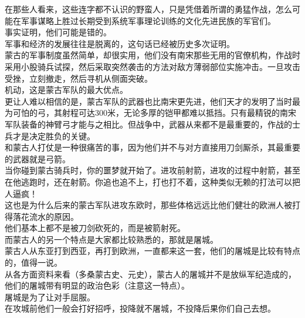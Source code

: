 \begin{multicols}{\theparacolNo}
在那些人看来，这些连字都不认识的野蛮人，只是凭借着所谓的勇猛作战，怎么可能在军事谋略上胜过长期受到系统军事理论训练的文化先进民族的军官们。\\

事实证明，他们可能是错的。\\

军事和经济的发展往往是脱离的，这句话已经被历史多次证明。\\

蒙古的军事制度虽然简单，却很实用，他们没有南宋那些无用的官僚机构，作战时采用小股骑兵试探，然后采取突然袭击的方法对敌方薄弱部位实施冲击。一旦攻击受挫，立刻撤走，然后寻机从侧面突破。\\

机动，这是蒙古军队的最大优点。\\

更让人难以相信的是，蒙古军队的武器也比南宋更先进，他们天才的发明了当时最为可怕的弓，其射程可达300米，无论多厚的铠甲都难以抵挡。只有最精锐的南宋军队装备的神臂弓才能与之相比。但战争中，武器从来都不是最重要的，作战的士兵才是决定胜负的关键。\\

和蒙古人打仗是一种很痛苦的事，因为他们并不与对方直接用刀剑厮杀，其最重要的武器就是弓箭。\\

当你碰到蒙古骑兵时，你的噩梦就开始了。进攻前射箭，进攻的过程中射箭，甚至在他逃跑时，还在射箭。你追也追不上，打也打不着，这种类似无赖的打法可以把人逼疯！\\

这也是为什么后来的蒙古军队进攻东欧时，那些体格远远比他们健壮的欧洲人被打得落花流水的原因。\\

他们基本上都不是被刀剑砍死的，而是被箭射死。\\

而蒙古人的另一个特点是大家都比较熟悉的，那就是屠城。\\

蒙古人从东亚打到西亚，再打到欧洲，一直都来这一套，他们的屠城是比较有特点的，值得一说。\\

从各方面资料来看（多桑蒙古史、元史），蒙古人的屠城并不是放纵军纪造成的，他们的屠城带有明显的政治色彩（注意这一特点）。\\

屠城是为了让对手屈服。\\

在攻城前他们一般会打好招呼，投降就不屠城，不投降后果你们自己去想。\\


\end{multicols}
